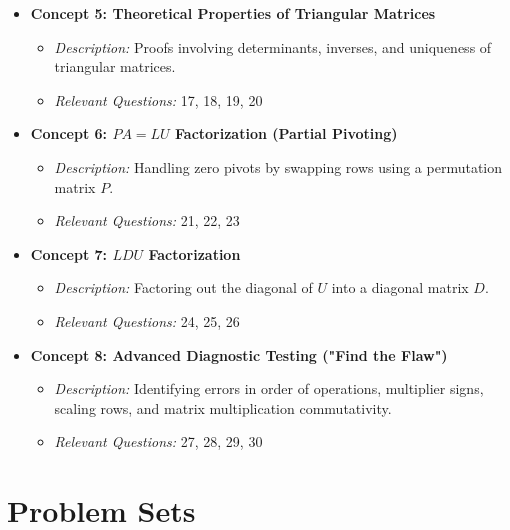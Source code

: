 \documentclass[11pt]{article}
\begin{document}
\begin{itemize}
    \item \textbf{Concept 5: Theoretical Properties of Triangular Matrices} 
    \begin{itemize}
        \item \textit{Description:} Proofs involving determinants, inverses, and uniqueness of triangular matrices.
        \item \textit{Relevant Questions:} 17, 18, 19, 20
    \end{itemize}
    
    \item \textbf{Concept 6: $PA = LU$ Factorization (Partial Pivoting)} 
    \begin{itemize}
        \item \textit{Description:} Handling zero pivots by swapping rows using a permutation matrix $P$.
        \item \textit{Relevant Questions:} 21, 22, 23
    \end{itemize}
    
    \item \textbf{Concept 7: $LDU$ Factorization} 
    \begin{itemize}
        \item \textit{Description:} Factoring out the diagonal of $U$ into a diagonal matrix $D$.
        \item \textit{Relevant Questions:} 24, 25, 26
    \end{itemize}
    
    \item \textbf{Concept 8: Advanced Diagnostic Testing ("Find the Flaw")} 
    \begin{itemize}
        \item \textit{Description:} Identifying errors in order of operations, multiplier signs, scaling rows, and matrix multiplication commutativity.
        \item \textit{Relevant Questions:} 27, 28, 29, 30
    \end{itemize}
\end{itemize}

\newpage

\section{Problem Sets}
\end{document}
